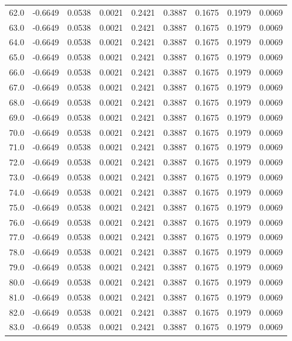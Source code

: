 \begin{longtable}{lrrrrrrrr}
62.0 & -0.6649 & 0.0538 & 0.0021 & 0.2421 & 0.3887 & 0.1675 & 0.1979 & 0.0069 \\
63.0 & -0.6649 & 0.0538 & 0.0021 & 0.2421 & 0.3887 & 0.1675 & 0.1979 & 0.0069 \\
64.0 & -0.6649 & 0.0538 & 0.0021 & 0.2421 & 0.3887 & 0.1675 & 0.1979 & 0.0069 \\
65.0 & -0.6649 & 0.0538 & 0.0021 & 0.2421 & 0.3887 & 0.1675 & 0.1979 & 0.0069 \\
66.0 & -0.6649 & 0.0538 & 0.0021 & 0.2421 & 0.3887 & 0.1675 & 0.1979 & 0.0069 \\
67.0 & -0.6649 & 0.0538 & 0.0021 & 0.2421 & 0.3887 & 0.1675 & 0.1979 & 0.0069 \\
68.0 & -0.6649 & 0.0538 & 0.0021 & 0.2421 & 0.3887 & 0.1675 & 0.1979 & 0.0069 \\
69.0 & -0.6649 & 0.0538 & 0.0021 & 0.2421 & 0.3887 & 0.1675 & 0.1979 & 0.0069 \\
70.0 & -0.6649 & 0.0538 & 0.0021 & 0.2421 & 0.3887 & 0.1675 & 0.1979 & 0.0069 \\
71.0 & -0.6649 & 0.0538 & 0.0021 & 0.2421 & 0.3887 & 0.1675 & 0.1979 & 0.0069 \\
72.0 & -0.6649 & 0.0538 & 0.0021 & 0.2421 & 0.3887 & 0.1675 & 0.1979 & 0.0069 \\
73.0 & -0.6649 & 0.0538 & 0.0021 & 0.2421 & 0.3887 & 0.1675 & 0.1979 & 0.0069 \\
74.0 & -0.6649 & 0.0538 & 0.0021 & 0.2421 & 0.3887 & 0.1675 & 0.1979 & 0.0069 \\
75.0 & -0.6649 & 0.0538 & 0.0021 & 0.2421 & 0.3887 & 0.1675 & 0.1979 & 0.0069 \\
76.0 & -0.6649 & 0.0538 & 0.0021 & 0.2421 & 0.3887 & 0.1675 & 0.1979 & 0.0069 \\
77.0 & -0.6649 & 0.0538 & 0.0021 & 0.2421 & 0.3887 & 0.1675 & 0.1979 & 0.0069 \\
78.0 & -0.6649 & 0.0538 & 0.0021 & 0.2421 & 0.3887 & 0.1675 & 0.1979 & 0.0069 \\
79.0 & -0.6649 & 0.0538 & 0.0021 & 0.2421 & 0.3887 & 0.1675 & 0.1979 & 0.0069 \\
80.0 & -0.6649 & 0.0538 & 0.0021 & 0.2421 & 0.3887 & 0.1675 & 0.1979 & 0.0069 \\
81.0 & -0.6649 & 0.0538 & 0.0021 & 0.2421 & 0.3887 & 0.1675 & 0.1979 & 0.0069 \\
82.0 & -0.6649 & 0.0538 & 0.0021 & 0.2421 & 0.3887 & 0.1675 & 0.1979 & 0.0069 \\
83.0 & -0.6649 & 0.0538 & 0.0021 & 0.2421 & 0.3887 & 0.1675 & 0.1979 & 0.0069 \\

\end{longtable}
